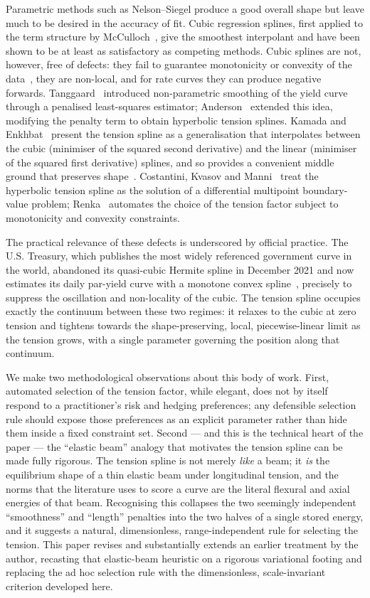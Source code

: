 \documentclass[]{interact}
\theoremstyle{plain}
\begin{document}
Parametric methods such as Nelson--Siegel produce a good overall shape but leave much to be
desired in the accuracy of fit. Cubic regression splines, first applied to the term structure
by McCulloch~\cite{McCulloch}, give the smoothest interpolant and have been shown to be at
least as satisfactory as competing methods. Cubic splines are not, however, free of defects:
they fail to guarantee monotonicity or convexity of the data~\cite{Anderson}, they are
non-local, and for rate curves they can produce negative forwards. Tanggaard~\cite{Tanggaard}
introduced non-parametric smoothing of the yield curve through a penalised least-squares
estimator; Anderson~\cite{Anderson} extended this idea, modifying the penalty term to obtain
hyperbolic tension splines. Kamada and Enkhbat~\cite{Kamada} present the tension spline as a
generalisation that interpolates between the cubic (minimiser of the squared second
derivative) and the linear (minimiser of the squared first derivative) splines, and so
provides a convenient middle ground that preserves shape~\cite{Costantini}. Costantini, Kvasov
and Manni~\cite{Costantini} treat the hyperbolic tension spline as the solution of a
differential multipoint boundary-value problem; Renka~\cite{Renka} automates the choice of the
tension factor subject to monotonicity and convexity constraints.

The practical relevance of these defects is underscored by official practice. The U.S.
Treasury, which publishes the most widely referenced government curve in the world, abandoned
its quasi-cubic Hermite spline in December 2021 and now estimates its daily par-yield curve
with a monotone convex spline~\cite{TreasuryMethod}, precisely to suppress the oscillation and
non-locality of the cubic. The tension spline occupies exactly the continuum between these two
regimes: it relaxes to the cubic at zero tension and tightens towards the shape-preserving,
local, piecewise-linear limit as the tension grows, with a single parameter governing the
position along that continuum.

We make two methodological observations about this body of work. First, automated selection
of the tension factor, while elegant, does not by itself respond to a practitioner's risk and
hedging preferences; any defensible selection rule should expose those preferences as an
explicit parameter rather than hide them inside a fixed constraint set. Second --- and this is
the technical heart of the paper --- the ``elastic beam'' analogy that motivates the tension
spline can be made fully rigorous. The tension spline is not merely \emph{like} a beam; it
\emph{is} the equilibrium shape of a thin elastic beam under longitudinal tension, and the
norms that the literature uses to score a curve are the literal flexural and axial energies of
that beam. Recognising this collapses the two seemingly independent ``smoothness'' and
``length'' penalties into the two halves of a single stored energy, and it suggests a natural,
dimensionless, range-independent rule for selecting the tension. This paper revises and
substantially extends an earlier treatment by the author, recasting that elastic-beam heuristic
on a rigorous variational footing and replacing the ad hoc selection rule with the
dimensionless, scale-invariant criterion developed here.
\end{document}
